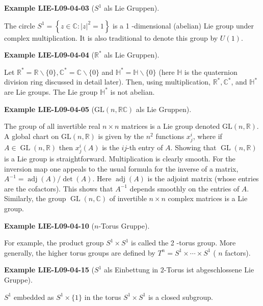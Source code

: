 \documentclass[10pt, letterpaper]{article}
\newcommand{\R}{\mathbb{R}}
\newcommand{\C}{\mathbb{C}}
\newcommand{\GL}{\mathrm{GL}}
\newcommand{\CustomHeading}[3]{%
  \par\medskip\noindent%
  \textbf{#1 #2} \textnormal{(#3)}.\enskip%
}
\newenvironment{EXA}[2]{\CustomHeading{Example}{#1}{#2}}{}
\begin{document}
\begin{EXA}{LIE-L09-04-03}{$S^1$ als Lie Gruppen}
The circle $S^{1}=\left\{z \in \mathbb{C}:|z|^{2}=1\right\}$ is a 1 -dimensional (abelian) Lie group under complex multiplication. It is also traditional to denote this group by $U(1)$.
\end{EXA}

\begin{EXA}{LIE-L09-04-04}{$\R^*$ als Lie Gruppen}
Let $\mathbb{R}^{*}=\mathbb{R} \backslash\{0\}, \mathbb{C}^{*}=\mathbb{C} \backslash\{0\}$ and $\mathbb{H}^{*}=\mathbb{H} \backslash\{0\}$ (here $\mathbb{H}$ is the quaternion division ring discussed in detail later). Then, using multiplication, $\mathbb{R}^{*}, \mathbb{C}^{*}$, and $\mathbb{H}^{*}$ are Lie groups. The Lie group $\mathbb{H}^{*}$ is not abelian.
\end{EXA}

\begin{EXA}{LIE-L09-04-05}{$\GL(n,\R \C)$ als Lie Gruppen}
The group of all invertible real $n \times n$ matrices is a Lie group denoted $\mathrm{GL}(n, \mathbb{R})$. A global chart on $\mathrm{GL}(n, \mathbb{R})$ is given by the $n^{2}$ functions $x_{j}^{i}$, where if $A \in \operatorname{GL}(n, \mathbb{R})$ then $x_{j}^{i}(A)$ is the $i j$-th entry of $A$. Showing that $\operatorname{GL}(n, \mathbb{R})$ is a Lie group is straightforward. Multiplication is clearly smooth. For the inversion map one appeals to the usual formula for the inverse of a matrix, $A^{-1}= \operatorname{adj}(A) / \operatorname{det}(A)$. Here $\operatorname{adj}(A)$ is the adjoint matrix (whose entries are the cofactors). This shows that $A^{-1}$ depends smoothly on the entries of $A$. Similarly, the group $\operatorname{GL}(n, \mathbb{C})$ of invertible $n \times n$ complex matrices is a Lie group.
\end{EXA}

\begin{EXA}{LIE-L09-04-10}{$n$-Torus Gruppe}
For example, the product group $S^{1} \times S^{1}$ is called the 2 -torus group. More generally, the higher torus groups are defined by $T^{n}=S^{1} \times \cdots \times S^{1}$ ( $n$ factors).
\end{EXA}

\begin{EXA}{LIE-L09-04-15}{$S^1$ als Einbettung in $2$-Torus ist abgeschlossene Lie Gruppe}
$S^{1}$ embedded as $S^{1} \times\{1\}$ in the torus $S^{1} \times S^{1}$ is a closed subgroup.
\end{EXA}
\end{document}
